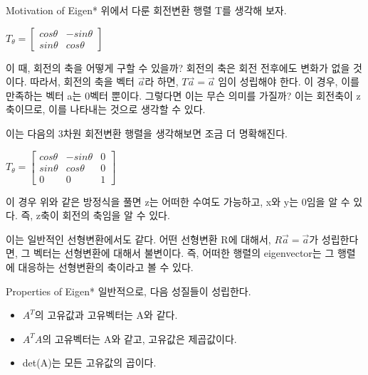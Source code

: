 \documentclass{beamer}
\begin{document}
\begin{frame}[allowframebreaks]{Motivation of Eigen*}
위에서 다룬 회전변환 행렬 T를 생각해 보자. 


$T_{\theta} = 
\left[ \begin{matrix}
cos \theta & - sin \theta  \\
sin \theta & cos \theta 
\end{matrix} \right] $

이 때, 회전의 축을 어떻게 구할 수 있을까? 회전의 축은 회전 전후에도 변화가 없을 것이다. 따라서, 회전의 축을 벡터 $\vec{a}$라 하면, $T\vec{a} = \vec{a}$ 임이 성립해야 한다. 이 경우, 이를 만족하는 벡터 a는 0벡터 뿐이다. 그렇다면 이는 무슨 의미를 가질까? 이는 회전축이 z축이므로, 이를 나타내는 것으로 생각할 수 있다. 

\framebreak 

이는 다음의 3차원 회전변환 행렬을 생각해보면 조금 더 명확해진다. 

$T_{\theta} = 
\left[ \begin{matrix}
cos \theta & - sin \theta & 0 \\
sin \theta & cos \theta & 0 \\ 
0&0&1
\end{matrix} \right] $

이 경우 위와 같은 방정식을 풀면 z는 어떠한 수여도 가능하고, x와 y는 0임을 알 수 있다. 즉, z축이 회전의 축임을 알 수 있다. 

이는 일반적인 선형변환에서도 같다. 어떤 선형변환 R에 대해서, $R\vec{a} = \vec{a}$가 성립한다면, 그 벡터는 선형변환에 대해서 불변이다. 즉, 어떠한 행렬의 eigenvector는 그 행렬에 대응하는 선형변환의 축이라고 볼 수 있다. 


\end{frame}

\begin{frame}{Properties of Eigen*}
일반적으로, 다음 성질들이 성립한다. 

\begin{itemize} 
\item $A^T$의 고유값과 고유벡터는 A와 같다. 
\item $A^TA$의 고유벡터는 A와 같고, 고유값은 제곱값이다. 
\item det(A)는 모든 고유값의 곱이다. 
\end{itemize}

\end{frame}
\end{document}
